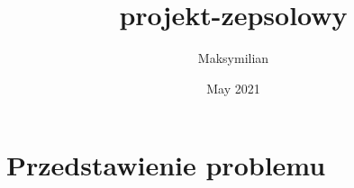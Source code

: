 \documentclass{article}
\title{projekt-zepsolowy}
\author{Maksymilian }
\date{May 2021}
\begin{document}
\maketitle
\tableofcontents
\newpage

\section{Przedstawienie problemu}
\end{document}
